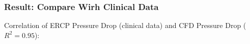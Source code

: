 \documentclass{beamer}
\begin{document}
\begin{frame}
    \fontsize{8pt}{10pt}\selectfont
    \frametitle{Result: Compare Wirh Clinical Data }
    
    Correlation of ERCP Pressure Drop (clinical data) and CFD Pressure Drop ($R^2=0.95$):
    
    \vspace{-0.015\textwidth}

    \begin{columns}
        \begin{column}{0.4\textwidth}

            \begin{table}[h!]
                \centering
                \renewcommand{\arraystretch}{1.2} %
                \setlength{\tabcolsep}{12pt} %
                \label{tab:transposed_table_sci}
                \end{table}
                
                
                \vspace{-0.05\textwidth}


                
        \end{column}

        \begin{column}{0.5\textwidth}


\end{column}
\end{columns}
\end{frame}
\end{document}

